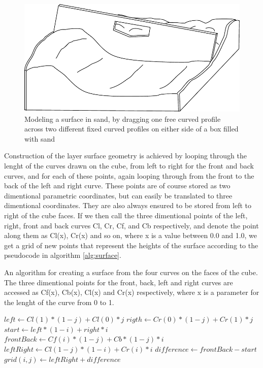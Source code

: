 \documentclass[a4paper,12pt]{report}
\begin{document}
\begin{figure}
\centering
 \includegraphics[width=0.8\linewidth]{thesis/sandbox.pdf}
 \caption{Modeling a surface in sand, by dragging one free curved profile across two different fixed curved profiles on either side of a box filled with sand}
 \label{fig:wooden}
\end{figure}


Construction of the layer surface geometry is achieved by looping through the lenght of the curves drawn on the cube, from left to right for the front and back curves, and for each of these points, again looping through from the front to the back of the left and right curve. These points are of course stored as two dimentional parametric coordinates, but can easily be translated to three dimentional coordinates. They are also always ensured to be stored from left to right of the cube faces. If we then call the three dimentional points of the left, right, front and back curves Cl, Cr, Cf, and Cb respectively, and denote the point along them as Cl(x), Cr(x) and so on, where x is a value between 0.0 and 1.0, we get a grid of new points that represent the heights of the surface according to the pseudocode in algorithm \ref{alg:surface}.

\begin{algorithm}
\caption{An algorithm for creating a surface from the four curves on the faces of the cube. The three dimentional points for the front,
back, left and right curves are accessed as Cf(x), Cb(x), Cl(x) and Cr(x) respectively, where x is a parameter for the lenght of the curve from 0 to 1.}
\label{alg:surface}
\begin{algorithmic}
  \State $left \gets Cl(1)*(1-j) + Cl(0)*j$
  \State $rigth \gets Cr(0)*(1-j) + Cr(1)*j$
  \State $start \gets left*(1-i) + right*i$
  \State $frontBack \gets Cf(i)*(1-j) + Cb*(1-j)*i$
  \State $leftRight \gets Cl(1-j)*(1-i) + Cr(i)*i$
  \State $difference \gets frontBack - start$
  \State $grid(i,j) \gets leftRight + difference$
\EndFor
\end{algorithmic}
\end{algorithm}
\end{document}
